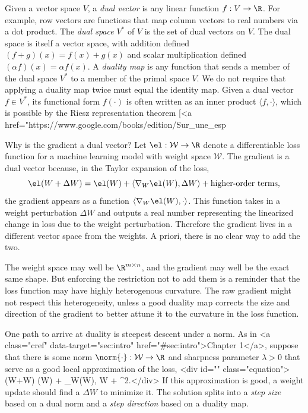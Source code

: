 \begin{definitionbox}
    Given a vector space $V$, a \textit{dual vector} is any linear function $f : V \to \R$. For example, row vectors are functions that map column vectors to real numbers via a dot product. The \textit{dual space} $V^\ast$ of $V$ is the set of dual vectors on $V$. The dual space is itself a vector space, with addition defined $(f + g)(x) = f(x) + g(x)$ and scalar multiplication defined $(\alpha f)(x) = \alpha f(x)$. A \textit{duality map} is any function that sends a member of the dual space $V^\ast$ to a member of the primal space $V$. We do not require that applying a duality map twice must equal the identity map. Given a dual vector $f \in V^\ast$, its functional form $f(\cdot)$ is often written as an inner product $\langle f, \cdot \rangle$, which is possible by the Riesz representation theorem [<a href="https://www.google.com/books/edition/Sur_une_esp%
\end{definitionbox}

Why is the gradient a dual vector? Let $\el : \mathcal{W} \to \R$ denote a differentiable loss function for a machine learning model with weight space $\mathcal{W}$. The gradient is a dual vector because, in the Taylor expansion of the loss, \begin{equation}\label{eq:taylor}
    \el(W+\Delta W) = \el(W) + \langle \nabla_W\el(W), \Delta W \rangle + \text{higher-order terms},
\end{equation}
the gradient appears as a function $\langle \nabla_W \el(W), \cdot \rangle$. This function takes in a weight perturbation $\Delta W$ and outputs a real number representing the linearized change in loss due to the weight perturbation. Therefore the gradient lives in a different vector space from the weights. A priori, there is no clear way to add the two.

The weight space may well be $\R^{m \times n}$, and the gradient may well be the exact same shape. But enforcing the restriction not to add them is a reminder that the loss function may have highly heterogenous curvature. The raw gradient might not respect this heterogeneity, unless a good duality map corrects the size and direction of the gradient to better attune it to the curvature in the loss function.

One path to arrive at duality is steepest descent under a norm. As in <a class="cref" data-target="sec:intro" href="#sec:intro">Chapter 1</a>, suppose that there is some norm $\norm{\cdot} : \mathcal{W} \to \R$ and sharpness parameter $\lambda > 0$ that serve as a good local approximation of the loss, <div id="" class="equation">    \el(W+\Delta W) \approx \el(W) + \langle \nabla_W\el(W), \Delta W \rangle +  \cdot {}^2.</div> If this approximation is good, a weight update should find a $\Delta W$ to minimize it. The solution splits into a \textit{step size} based on a dual norm and a \textit{step direction} based on a duality map.

